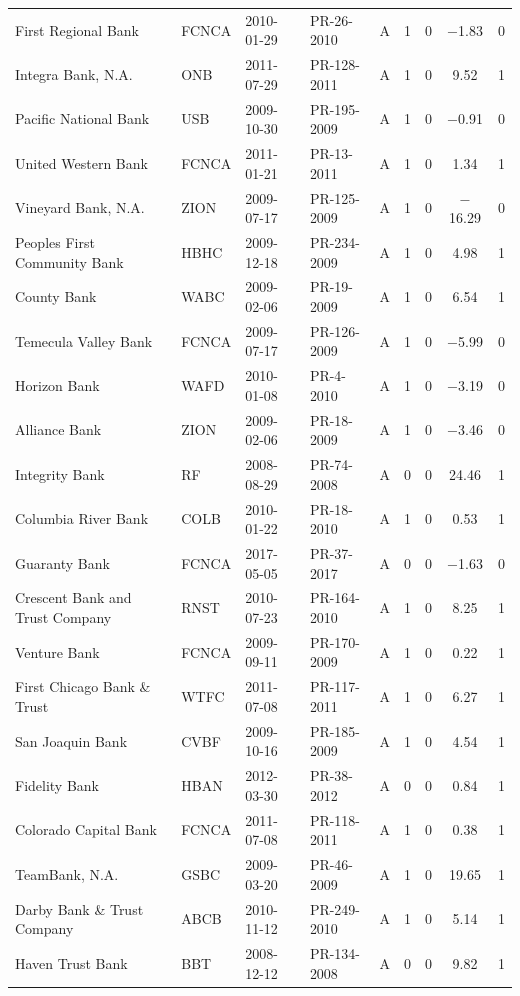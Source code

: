 \begin{table}[!t]
\begin{tabular*}{\textwidth}{@{\extracolsep{\fill}}llllccccc}
First Regional Bank & FCNCA & 2010-01-29 & PR-26-2010 & A & 1 & 0 & $-$1.83 & 0 \\
Integra Bank, N.A. & ONB & 2011-07-29 & PR-128-2011 & A & 1 & 0 & 9.52 & 1 \\
Pacific National Bank & USB & 2009-10-30 & PR-195-2009 & A & 1 & 0 & $-$0.91 & 0 \\
United Western Bank & FCNCA & 2011-01-21 & PR-13-2011 & A & 1 & 0 & 1.34 & 1 \\
Vineyard Bank, N.A. & ZION & 2009-07-17 & PR-125-2009 & A & 1 & 0 & $-$16.29 & 0 \\
Peoples First Community Bank & HBHC & 2009-12-18 & PR-234-2009 & A & 1 & 0 & 4.98 & 1 \\
County Bank & WABC & 2009-02-06 & PR-19-2009 & A & 1 & 0 & 6.54 & 1 \\
Temecula Valley Bank & FCNCA & 2009-07-17 & PR-126-2009 & A & 1 & 0 & $-$5.99 & 0 \\
Horizon Bank & WAFD & 2010-01-08 & PR-4-2010 & A & 1 & 0 & $-$3.19 & 0 \\
Alliance Bank & ZION & 2009-02-06 & PR-18-2009 & A & 1 & 0 & $-$3.46 & 0 \\
Integrity Bank & RF & 2008-08-29 & PR-74-2008 & A & 0 & 0 & 24.46 & 1 \\
Columbia River Bank & COLB & 2010-01-22 & PR-18-2010 & A & 1 & 0 & 0.53 & 1 \\
Guaranty Bank & FCNCA & 2017-05-05 & PR-37-2017 & A & 0 & 0 & $-$1.63 & 0 \\
Crescent Bank and Trust Company & RNST & 2010-07-23 & PR-164-2010 & A & 1 & 0 & 8.25 & 1 \\
Venture Bank & FCNCA & 2009-09-11 & PR-170-2009 & A & 1 & 0 & 0.22 & 1 \\
First Chicago Bank \& Trust & WTFC & 2011-07-08 & PR-117-2011 & A & 1 & 0 & 6.27 & 1 \\
San Joaquin Bank & CVBF & 2009-10-16 & PR-185-2009 & A & 1 & 0 & 4.54 & 1 \\
Fidelity Bank & HBAN & 2012-03-30 & PR-38-2012 & A & 0 & 0 & 0.84 & 1 \\
Colorado Capital Bank & FCNCA & 2011-07-08 & PR-118-2011 & A & 1 & 0 & 0.38 & 1 \\
TeamBank, N.A. & GSBC & 2009-03-20 & PR-46-2009 & A & 1 & 0 & 19.65 & 1 \\
Darby Bank \& Trust Company & ABCB & 2010-11-12 & PR-249-2010 & A & 1 & 0 & 5.14 & 1 \\
Haven Trust Bank & BBT & 2008-12-12 & PR-134-2008 & A & 0 & 0 & 9.82 & 1 \\

\end{tabular*}
\end{table}
